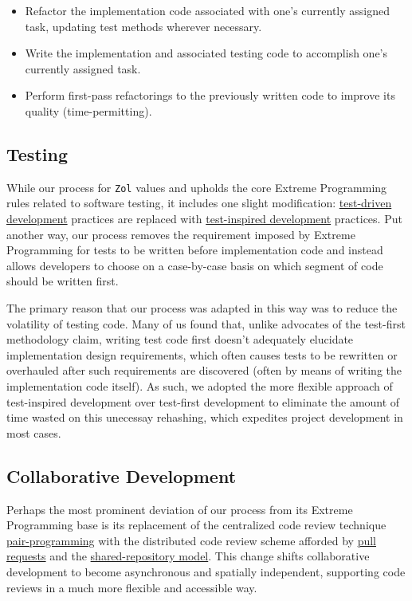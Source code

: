 \documentclass{article}
\newcommand{\projectname}[0] {\texttt{Zol} }
\begin{document}
		\begin{itemize}
			\item Refactor the implementation code associated with one's currently
			assigned task, updating test methods wherever necessary.

			\item Write the implementation and associated testing code to
			accomplish one's currently assigned task.

			\item Perform first-pass refactorings to the previously written code
			to improve its quality (time-permitting).
		\end{itemize}

		\subsection{Testing}
		While our process for \projectname values and upholds the core Extreme 
		Programming rules related to software testing, it includes one slight
		modification: \href{http://en.wikipedia.org/wiki/Test-driven\_ development}
		{test-driven development} practices are replaced with
		\href{http://treyhunner.com/2013/07/test-inspired-development/}
		{test-inspired development} practices.  Put another way, our process
		removes the requirement imposed by Extreme Programming for tests to be
		written before implementation code and instead allows developers to
		choose on a case-by-case basis on which segment of code should be
		written first.
		
		The primary reason that our process was adapted in this way was to
		reduce the volatility of testing code.  Many of us found that, unlike
		advocates of the test-first methodology claim, writing test code first
		doesn't adequately elucidate implementation design requirements, which
		often causes tests to be rewritten or overhauled after such requirements
		are discovered (often by means of writing the implementation code itself).
		As such, we adopted the more flexible approach of test-inspired
		development over test-first development to eliminate the amount of time
		wasted on this unecessay rehashing, which expedites project development
		in most cases.

		\subsection{Collaborative Development}
		Perhaps the most prominent deviation of our process from its Extreme
		Programming base is its replacement of the centralized code review
		technique \href{http://www.extremeprogramming.org/rules/pair.html}
		{pair-programming} with the distributed code review scheme afforded
		by \href{https://www.atlassian.com/git/workflows#!pull-request}
		{pull requests} and the \href{https://help.github.com/articles/using-pull-requests#shared-repository-model}
		{shared-repository model}.  This change shifts collaborative
		development to become asynchronous and spatially independent, supporting
		code reviews in a much more flexible and accessible way.
\end{document}
